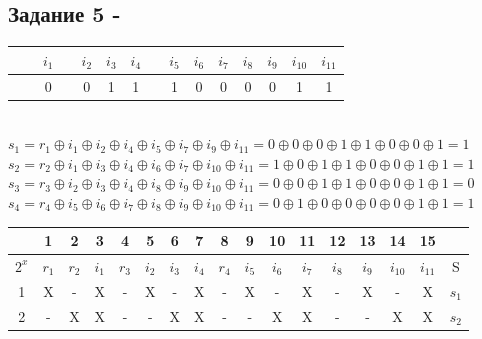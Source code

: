 \begin{flushleft}
\subsection{Задание 5 - }
\begin{tabular}{|c|c|c|c|c|c|c|c|c|c|c|c|c|c|c|}
\hline
\cellcolor{orange!40}{$r_1$} & \cellcolor{orange!40}{$r_2$} & $i_1$ & \cellcolor{orange!40}{$r_3$} & $i_2$ & $i_3$ & $i_4$ & \cellcolor{orange!40}{$r_4$} & $i_5$ & $i_6$ & $i_7$ & $i_8$ & $i_9$ & $i_{10}$ & $i_{11}$  \\ \hline
\cellcolor{orange!40}{0} & \cellcolor{orange!40}{1} & 0 & \cellcolor{orange!40}{0} & 0 & 1 & 1 & \cellcolor{orange!40}{0} & 1 & 0 & 0 & 0 & 0 & 1 & 1\\ \hline 
\end{tabular} \\
\vspace{0.25cm}
$s_1 = r_1 \oplus i_1 \oplus i_2 \oplus i_4 \oplus i_5 \oplus i_7 \oplus i_9 \oplus i_{11} = 0 \oplus 0 \oplus 0 \oplus 1 \oplus 1 \oplus 0 \oplus 0 \oplus 1 = 1$ \\
$s_2 = r_2 \oplus i_1 \oplus i_3 \oplus i_4 \oplus i_6 \oplus i_7 \oplus i_{10} \oplus i_{11} = 1 \oplus 0 \oplus 1 \oplus 1 \oplus 0 \oplus 0 \oplus 1 \oplus 1 = 1$ \\
$s_3 = r_3 \oplus i_2 \oplus i_3 \oplus i_4 \oplus i_8 \oplus i_9 \oplus i_{10} \oplus i_{11} = 0 \oplus 0 \oplus 1 \oplus 1 \oplus 0 \oplus 0 \oplus 1 \oplus 1 = 0$\\
$s_4 = r_4 \oplus i_5 \oplus i_6 \oplus i_7 \oplus i_8 \oplus i_9 \oplus i_{10} \oplus i_{11} = 0 \oplus 1 \oplus 0 \oplus 0 \oplus 0 \oplus 0 \oplus 1 \oplus 1 = 1$ \\
\vspace{0.25cm}
\begin{tabular}{|c|c|c|c|c|c|c|c|c|c|c|c|c|c|c|c|c|} \hline
 & 1 & 2 & 3 & 4 & 5 & 6 & 7 & 8 & 9 & 10 & 11 & 12 & 13 & 14 & 15 &  \\ \hline
$2^x$ & $r_1$ & $r_2$ & $i_1$ & $r_3$ & $i_2$ & $i_3$ & $i_4$ & $r_4$ & $i_5$ & $i_6$ & \cellcolor{red!20}$i_7$ & $i_8$ & $i_9$ & $i_{10}$ & $i_{11}$ & S \\ \hline
1 & \cellcolor{blue!20}X & - & \cellcolor{blue!20}X & - & \cellcolor{blue!20}X & - & \cellcolor{blue!20}X & - & \cellcolor{blue!20}X & - & \cellcolor{red!20}X & - & \cellcolor{blue!20}X & - & \cellcolor{blue!20}X & $s_1$ \\ \hline
2 & - & \cellcolor{yellow!20}X & \cellcolor{yellow!20}X & - & - & \cellcolor{yellow!20}X & \cellcolor{yellow!20}X & - & - & \cellcolor{yellow!20}X & \cellcolor{red!20}X & - & - & \cellcolor{yellow!20}X & \cellcolor{yellow!20}X & $s_2$ \\ \hline

\end{tabular}
\end{flushleft}
